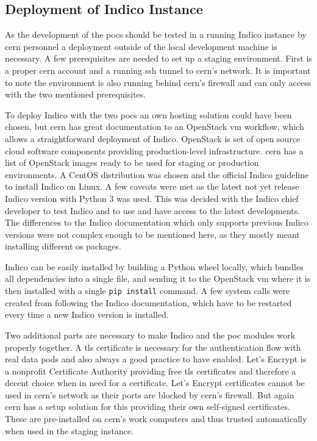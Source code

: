 \subsection{Deployment of Indico Instance}

As the development of the \glspl{poc} should be tested in a running Indico instance by \gls{cern} personnel a deployment outside of the local development machine is necessary. A few prerequisites are needed to set up a staging environment. First is a proper \gls{cern} account and a running \gls{ssh} tunnel to \gls{cern}'s network. It is important to note the environment is also running behind \gls{cern}'s firewall and can only access with the two mentioned prerequisites.

To deploy Indico with the two \glspl{poc} an own hosting solution could have been chosen, but \gls{cern} has great documentation to an OpenStack \gls{vm} \cite{openstack} workflow, which allows a straightforward deployment of Indico. OpenStack is set of open source cloud software components providing production-level infrastructure. \gls{cern} has a list of OpenStack images ready to be used for staging or production environments. A CentOS \cite{centos} distribution was chosen and the official Indico guideline to install Indico on Linux. A few caveats were met as the latest not yet release Indico version with Python 3 was used. This was decided with the Indico chief developer to test Indico and to use and have access to the latest developments. The differences to the Indico documentation which only supports previous Indico versions were not complex enough to be mentioned here, as they mostly meant installing different \gls{os} packages.

Indico can be easily installed by building a Python wheel locally, which bundles all dependencies into a single file, and sending it to the OpenStack \gls{vm} where it is then installed with a single \texttt{pip install} command. A few system calls were created from following the Indico documentation, which have to be restarted every time a new Indico version is installed.

Two additional parts are necessary to make Indico and the \gls{poc} modules work properly together. A \gls{tls} certificate is necessary for the authentication flow with real data pods and also always a good practice to have enabled. Let's Encrypt \cite{letsencrypt} is a nonprofit Certificate Authority providing free \gls{tls} certificates and therefore a decent choice when in need for a certificate. Let's Encrypt certificates cannot be used in \gls{cern}'s network as their ports are blocked by \gls{cern}'s firewall. But again \gls{cern} has a setup solution for this providing their own self-signed certificates. These are pre-installed on \gls{cern}'s work computers and thus trusted automatically when used in the staging instance.

